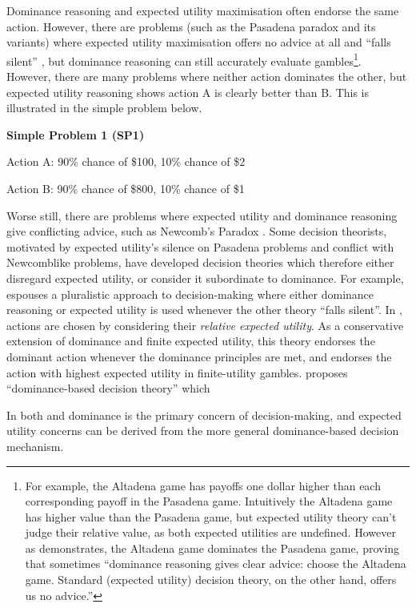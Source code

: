 \documentclass{article}
\begin{document}
Dominance reasoning and expected utility maximisation often endorse the same action. However, there are problems (such as the Pasadena paradox and its variants) where expected utility maximisation offers no advice at all and ``falls silent'' \citep{nover2004vexing}, but dominance reasoning can still accurately evaluate gambles\footnote{For example, the Altadena game has payoffs one dollar higher than each corresponding payoff in the Pasadena game. Intuitively the Altadena game has higher value than the Pasadena game, but expected utility theory can't judge their relative value, as both expected utilities are undefined. However as \citep{colyvan2006no} demonstrates, the Altadena game dominates the Pasadena game, proving that sometimes ``dominance reasoning gives clear advice: choose the Altadena game. Standard (expected utility) decision theory, on the other hand, offers us no advice.''}. However, there are many problems where neither action dominates the other, but expected utility reasoning shows action A is clearly better than B. This is illustrated in the simple problem below.

\begin{center}
\textbf{Simple Problem 1 (SP1)}

Action A: 90\% chance of \$100, 10\% chance of \$2

Action B: 90\% chance of \$800, 10\% chance of \$1
\end{center}

Worse still, there are problems where expected utility and dominance reasoning give conflicting advice, such as Newcomb's Paradox \citep[pg. 110]{resnik1987choices}. Some decision theorists, motivated by expected utility's silence on Pasadena problems and conflict with Newcomblike problems, have developed decision theories which therefore either disregard expected utility, or consider it subordinate to dominance. For example, \citep{colyvan2006no} espouses a pluralistic approach to decision-making where either dominance reasoning or expected utility is used whenever the other theory ``falls silent''. In \citep{colyvan2008relative}, actions are chosen by considering their \textit{relative expected utility}. As a conservative extension of dominance and finite expected utility, this theory endorses the dominant action whenever the dominance principles are met, and endorses the action with highest expected utility in finite-utility gambles. \citep{easwaran2009dominance} proposes ``dominance-based decision theory'' which 

In both \citep{easwaran2009dominance} and \citep{colyvan2008relative} dominance is the primary concern of decision-making, and expected utility concerns can be derived from the more general dominance-based decision mechanism.
\end{document}
